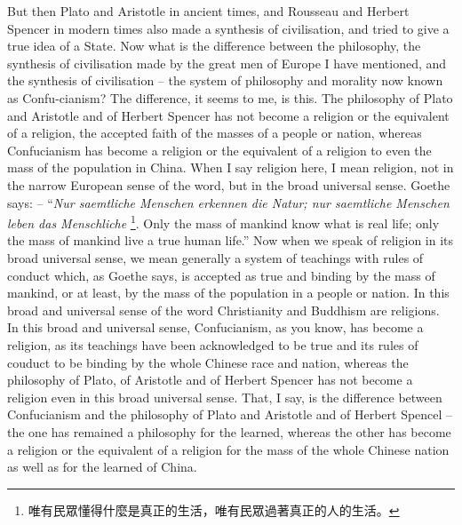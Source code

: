 But then Plato and Aristotle in ancient times, and Rousseau and
Herbert Spencer in modern times also made a synthesis of civilisation, and tried to give a true idea of a State. Now what is the difference between the philosophy, the synthesis of civilisation made by the great men of Europe I have mentioned, and the synthesis of civilisation -- the system of philosophy and morality now known as Confu-cianism? The difference, it seems to me, is this. The philosophy of Plato and Aristotle and of Herbert Spencer has not become a religion or the equivalent of a religion, the accepted faith of the masses of a people or nation, whereas Confucianism has become a religion or the equivalent of a religion to even the mass of the population in China. When I say religion here, I mean religion, not in the narrow European sense of the word, but in the broad universal sense. Goethe says: -- ``\emph{Nur saemtliche Menschen erkennen die Natur; nur saemtliche Menschen leben das Menschliche} \footnote{唯有民眾懂得什麼是真正的生活，唯有民眾過著真正的人的生活。}.
Only the mass of mankind know what is real life; only the mass of mankind live a true human life.'' Now when we speak of religion in its broad universal sense, we mean generally a system of teachings with rules of conduct which, as Goethe says, is accepted as true and binding by the mass of mankind, or at least, by the mass of the population in a people or nation. In this broad and universal sense of the word Christianity and Buddhism are religions. In this broad and universal sense, Confucianism, as you know, has become a religion, as its teachings have been acknowledged to be true and its rules of couduct to be binding by the whole Chinese race and nation, whereas the philosophy of Plato, of Aristotle and of Herbert Spencer has not become a religion even in this broad universal sense. That, I say, is the difference between Confucianism and the philosophy of Plato and Aristotle and of Herbert Spencel -- the one has remained a philosophy for the learned, whereas the other has become a religion or the equivalent of a religion for the mass of the whole Chinese nation as well as for the learned of China.

